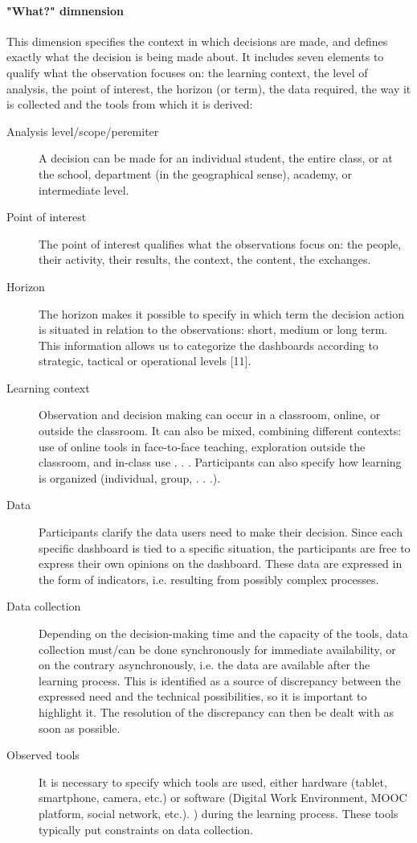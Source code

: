 \documentclass[preprint,12pt]{elsarticle}
\begin{document}
\paragraph{"What?" dimnension}
This dimension specifies the context in which decisions are made, and defines exactly what the decision is being made about. It includes seven elements to qualify what the observation focuses on: the learning context, the level of analysis, the point of interest, the horizon (or term), the data required, the way it is collected and the tools from which it is derived:
\begin{description}
    \item[Analysis level/scope/peremiter] A decision can be made for an individual student, the entire class, or at the school, department (in the geographical sense), academy, or intermediate level.
    \item[Point of interest] The point of interest qualifies what the observations focus on: the people, their activity, their results, the context, the content, the exchanges.
    \item[Horizon]  The horizon makes it possible to specify in which term the decision action is situated in relation to the observations: short, medium or long term. This information allows us to categorize the dashboards according to strategic, tactical or operational levels [11].
    \item[Learning context] Observation and decision making can occur in a classroom, online, or outside the classroom. It can also be mixed, combining different contexts: use of online tools in face-to-face teaching, exploration outside the classroom, and in-class use . . . Participants can also specify how learning is organized (individual, group, . . .).
    \item[Data]  Participants clarify the data users need to make their decision. Since each specific dashboard is tied to a specific situation, the participants are free to express their own opinions on the dashboard. These data are expressed in the form of indicators, i.e. resulting from possibly complex processes.
    \item[Data collection] Depending on the decision-making time and the capacity of the tools, data collection must/can be done synchronously for immediate availability, or on the contrary asynchronously, i.e. the data are available after the learning process. This is identified as a source of discrepancy between the expressed need and the technical possibilities, so it is important to highlight it. The resolution of the discrepancy can then be dealt with as soon as possible.
    \item[Observed tools] It is necessary to specify which tools are used, either hardware (tablet, smartphone, camera, etc.) or software (Digital Work Environment, MOOC platform, social network, etc.). ) during the learning process. These tools typically put constraints on data collection. 
\end{description}
\end{document}
